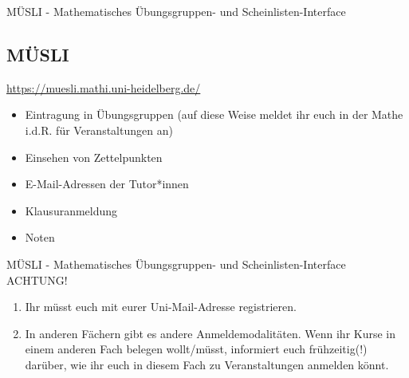 \begin{frame}{MÜSLI - Mathematisches Übungsgruppen- und Scheinlisten-Interface}
  \subsection{MÜSLI}

  \url{https://muesli.mathi.uni-heidelberg.de/}

  \begin{center}
  \end{center}

    \begin{itemize}
      \item{Eintragung in Übungsgruppen (auf diese Weise meldet ihr euch in der Mathe i.d.R. für Veranstaltungen an)}
      \item{Einsehen von Zettelpunkten}
      \item{E-Mail-Adressen der Tutor*innen}
      \item{Klausuranmeldung}
      \item{Noten}
    \end{itemize}
\end{frame}

\begin{frame}{MÜSLI - Mathematisches Übungsgruppen- und Scheinlisten-Interface}
      ACHTUNG!\\
      \begin{enumerate}
        \item{Ihr müsst euch mit eurer Uni-Mail-Adresse registrieren.}
        \item{In anderen Fächern gibt es andere Anmeldemodalitäten. Wenn ihr Kurse in einem anderen Fach belegen wollt/müsst, informiert euch frühzeitig(!) darüber, wie ihr euch in diesem Fach zu Veranstaltungen anmelden könnt.}
      \end{enumerate}
\end{frame}


